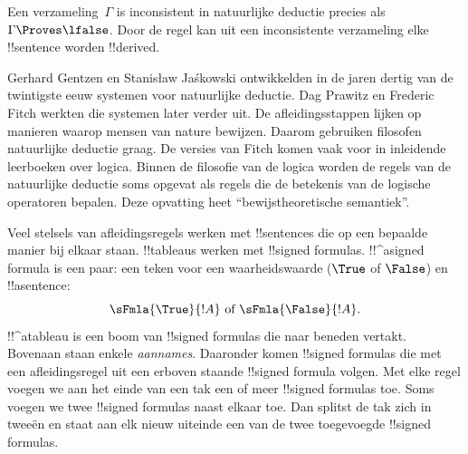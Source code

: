 \documentclass[openany]{memoir}
\begin{document}
Een verzameling~$\Gamma$ is inconsistent in natuurlijke deductie
precies als $\Gamma \Proves \lfalse$. Door de regel \FalseInt{} kan uit
een inconsistente verzameling elke !!{sentence} worden !!{derive}d.

Gerhard Gentzen en Stanis\l{}aw Ja\'skowski ontwikkelden in de jaren
dertig van de twintigste eeuw systemen voor natuurlijke deductie. Dag
Prawitz en Frederic Fitch werkten die systemen later verder uit. De
afleidingsstappen lijken op manieren waarop mensen van nature bewijzen.
Daarom gebruiken filosofen natuurlijke deductie graag. De versies van
Fitch komen vaak voor in inleidende leerboeken over logica. Binnen de
filosofie van de logica worden de regels van de natuurlijke deductie
soms opgevat als regels die de betekenis van de logische operatoren
bepalen. Deze opvatting heet ``bewijstheoretische semantiek''.
\endgroup

\begingroup
\def\olfilename{OLP-0067}
\def\olfilepath{content/first-order-logic/proof-systems/}
\hypertarget{unit-OLP-0067}{}



      {}
      {}


Veel stelsels van afleidingsregels werken met !!{sentence}s die op een
bepaalde manier bij elkaar staan. !!{tableau}s werken met
!!{signed formula}s. !!^a{signed formula} is een paar: een teken voor
een waarheidswaarde ($\True$ of $\False$) en !!a{sentence}:
\[
\sFmla{\True}{!A} \text{ of } \sFmla{\False}{!A}.
\]
!!^a{tableau} is een boom van !!{signed formula}s die naar beneden
vertakt. Bovenaan staan enkele \emph{aannames}. Daaronder komen
!!{signed formula}s die met een afleidingsregel uit een erboven staande
!!{signed formula} volgen. Met elke regel voegen we aan het einde van
een tak een of meer !!{signed formula}s toe. Soms voegen we twee
!!{signed formula}s naast elkaar toe. Dan splitst de tak zich in
tweeën en staat aan elk nieuw uiteinde een van de twee toegevoegde
!!{signed formula}s.
\end{document}
